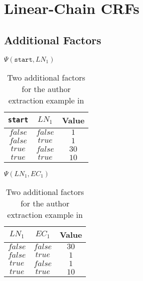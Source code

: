 \section{Linear-Chain CRFs}\label{app:sec-linear-chain-crfs}
\subsection{Additional Factors}\label{app:subsec-lccrf-additional-factors}

\begin{table}[H]
\begin{minipage}{0.5\linewidth}
\centering
$\Psi(\texttt{start},LN_1)$\par
\smallskip
\begin{tabular}{c c c}
 \toprule
 \texttt{start} & $LN_1$ & Value \\
 \midrule
 $false$ & $false$ & $1$ \\
 $false$ & $true$ & $1$ \\
 $true$ & $false$ & $30$ \\
 $true$ & $true$ & $10$ \\
 \bottomrule
\end{tabular}
\end{minipage}
\hfill
\begin{minipage}{0.5\linewidth}
\centering
$\Psi(LN_1,EC_1)$\par
\smallskip
\begin{tabular}{c c c}
 \toprule
 $LN_1$ & $EC_1$ & Value \\
 \midrule
 $false$ & $false$ & $30$ \\
 $false$ & $true$ & $1$ \\
 $true$ & $false$ & $1$ \\
 $true$ & $true$ & $10$ \\
 \bottomrule
\end{tabular}
\end{minipage}
\caption{Two additional factors for the author extraction example in }
\label{tab:example-linear-chain-crf-factors}
\end{table}

